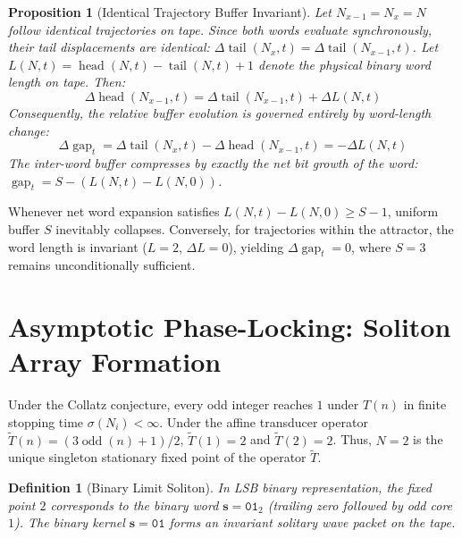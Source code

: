 \documentclass[journal,10pt,twocolumn]{IEEEtran}
\newtheorem{definition}{Definition}
\newtheorem{proposition}{Proposition}
\DeclareMathOperator{\tail}{tail}
\DeclareMathOperator{\head}{head}
\DeclareMathOperator{\gap}{gap}
\DeclareMathOperator{\oddcore}{odd}
\begin{document}
\begin{proposition}[Identical Trajectory Buffer Invariant]
\label{prop:identical_compression}
Let $N_{x-1} = N_x = N$ follow identical trajectories on tape. Since both words evaluate synchronously, their tail displacements are identical: $\Delta\tail(N_x, t) = \Delta\tail(N_{x-1}, t)$. Let $L(N, t) = \head(N, t) - \tail(N, t) + 1$ denote the physical binary word length on tape. Then:
\begin{equation}
\Delta\head(N_{x-1}, t) = \Delta\tail(N_{x-1}, t) + \Delta L(N, t)
\end{equation}
Consequently, the relative buffer evolution is governed entirely by word-length change:
\begin{equation}
\Delta\gap_t = \Delta\tail(N_x, t) - \Delta\head(N_{x-1}, t) = -\Delta L(N, t)
\label{eq:identical_gap_invariant}
\end{equation}
The inter-word buffer compresses by exactly the net bit growth of the word: $\gap_t = S - (L(N, t) - L(N, 0))$.
\end{proposition}
Whenever net word expansion satisfies $L(N, t) - L(N, 0) \ge S - 1$, uniform buffer $S$ inevitably collapses.
Conversely, for trajectories within the attractor, the word length is invariant ($L=2$, $\Delta L = 0$), yielding $\Delta \gap_t = 0$, where $S = 3$ remains unconditionally sufficient.

\section{Asymptotic Phase-Locking: Soliton Array Formation}
Under the Collatz conjecture, every odd integer reaches $1$ under $T(n)$ in finite stopping time $\sigma(N_i) < \infty$. Under the affine transducer operator $\widetilde{T}(n) = (3\oddcore(n)+1)/2$, $\widetilde{T}(1) = 2$ and $\widetilde{T}(2) = 2$. Thus, $N = 2$ is the unique singleton stationary fixed point of the operator $\widetilde{T}$.

\begin{definition}[Binary Limit Soliton]
In LSB binary representation, the fixed point $2$ corresponds to the binary word $\mathbf{s} = \texttt{01}_2$ (trailing zero followed by odd core $1$). The binary kernel $\mathbf{s} = \texttt{01}$ forms an invariant solitary wave packet on the tape.
\end{definition}
\end{document}
